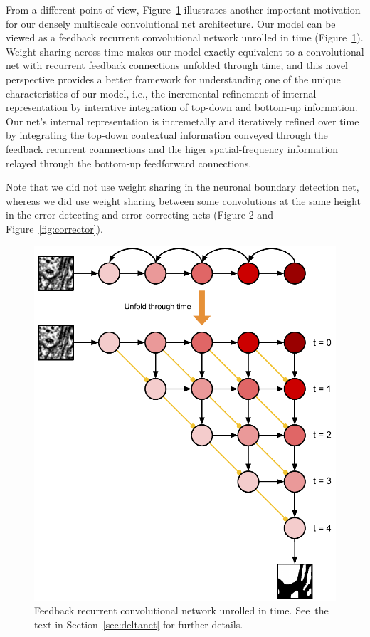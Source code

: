 \documentclass{article}
\begin{document}
From a different point of view, Figure~\ref{fig:unfold} illustrates another
important motivation for our densely multiscale convolutional net architecture.
Our model can be viewed as a feedback recurrent convolutional network unrolled
in time (Figure~\ref{fig:unfold}). Weight sharing across time makes our model
exactly equivalent to a convolutional net with recurrent feedback connections
unfolded through time, and this novel perspective provides a better framework
for understanding one of the unique characteristics of our model, i.e., the
incremental refinement of internal representation by interative integration of
top-down and bottom-up information. Our net's internal representation is
incremetally and iteratively refined over time by integrating the top-down
contextual information conveyed through the feedback recurrent connnections and
the higer spatial-frequency information relayed through the bottom-up
feedforward connections.

Note that we did not use weight sharing in the neuronal boundary detection net,
whereas we did use weight sharing between some convolutions at the same height
in the error-detecting and error-correcting nets (Figure 2 and
Figure~\ref{fig:corrector}).

\begin{figure}[!t]
\centering
\includegraphics[width=0.65\linewidth]{unfold.pdf}

\caption{Feedback recurrent convolutional network unrolled in time.
See~the text in Section~\ref{sec:deltanet} for further details.}

\label{fig:unfold}
\end{figure}
\end{document}
